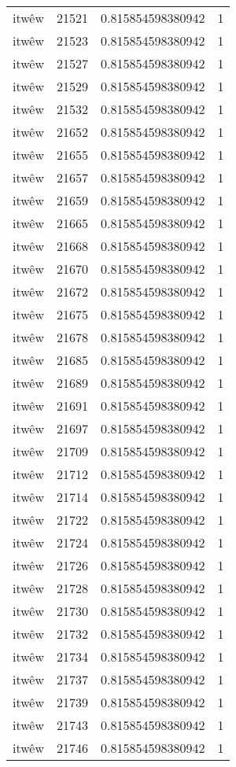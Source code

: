 \begin{longtable}{llll}
itwêw & 21521 & 0.815854598380942 & 1 \\
itwêw & 21523 & 0.815854598380942 & 1 \\
itwêw & 21527 & 0.815854598380942 & 1 \\
itwêw & 21529 & 0.815854598380942 & 1 \\
itwêw & 21532 & 0.815854598380942 & 1 \\
itwêw & 21652 & 0.815854598380942 & 1 \\
itwêw & 21655 & 0.815854598380942 & 1 \\
itwêw & 21657 & 0.815854598380942 & 1 \\
itwêw & 21659 & 0.815854598380942 & 1 \\
itwêw & 21665 & 0.815854598380942 & 1 \\
itwêw & 21668 & 0.815854598380942 & 1 \\
itwêw & 21670 & 0.815854598380942 & 1 \\
itwêw & 21672 & 0.815854598380942 & 1 \\
itwêw & 21675 & 0.815854598380942 & 1 \\
itwêw & 21678 & 0.815854598380942 & 1 \\
itwêw & 21685 & 0.815854598380942 & 1 \\
itwêw & 21689 & 0.815854598380942 & 1 \\
itwêw & 21691 & 0.815854598380942 & 1 \\
itwêw & 21697 & 0.815854598380942 & 1 \\
itwêw & 21709 & 0.815854598380942 & 1 \\
itwêw & 21712 & 0.815854598380942 & 1 \\
itwêw & 21714 & 0.815854598380942 & 1 \\
itwêw & 21722 & 0.815854598380942 & 1 \\
itwêw & 21724 & 0.815854598380942 & 1 \\
itwêw & 21726 & 0.815854598380942 & 1 \\
itwêw & 21728 & 0.815854598380942 & 1 \\
itwêw & 21730 & 0.815854598380942 & 1 \\
itwêw & 21732 & 0.815854598380942 & 1 \\
itwêw & 21734 & 0.815854598380942 & 1 \\
itwêw & 21737 & 0.815854598380942 & 1 \\
itwêw & 21739 & 0.815854598380942 & 1 \\
itwêw & 21743 & 0.815854598380942 & 1 \\
itwêw & 21746 & 0.815854598380942 & 1 \\

\end{longtable}
